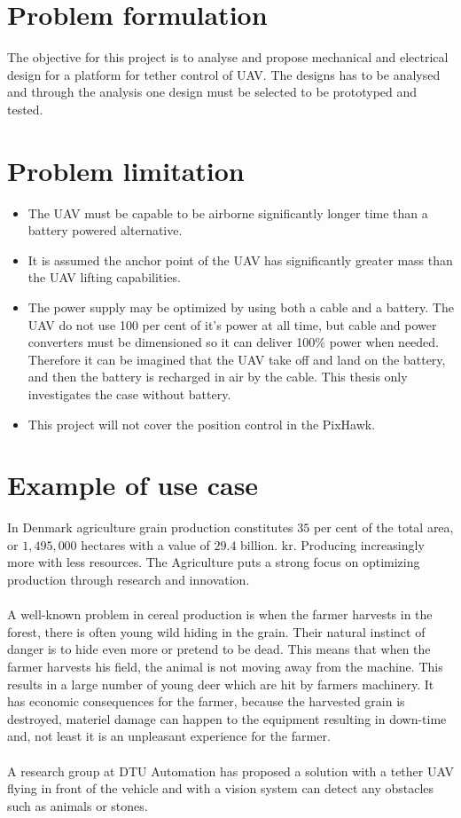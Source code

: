 \section{Problem formulation} 

The objective for this project is to analyse and propose mechanical and electrical design for a platform for tether control of UAV. The designs has to be analysed and through the analysis one design must be selected to be prototyped and tested.

\section{Problem limitation}
\begin{itemize}
\item The UAV must be capable to be airborne significantly longer time than a battery powered alternative.
\item It is assumed the anchor point of the UAV has significantly greater mass than the UAV lifting capabilities.
\item The power supply may be optimized by using both a cable and a battery. The UAV do not use 100 per cent of it's power at all time, but cable and power converters must be dimensioned so it can deliver 100\% power when needed. Therefore it can be imagined that the UAV take off and land on the battery, and then the battery is recharged in air by the cable. This thesis only investigates the case without battery.
\item This project will not cover the position control in the PixHawk. 
\end{itemize}


\section{Example of use case}

In Denmark agriculture grain production constitutes $35$ per cent of the total area, or $1,495,000$ hectares with a value of $29.4$ billion. kr. Producing increasingly more with less resources. The Agriculture puts a strong focus on optimizing production through research and innovation\cite{FødevarerLandbrug2013}.
\\
\\
A well-known problem in cereal production is when the farmer harvests in the forest, there is often young wild hiding in the grain. Their natural instinct of danger is to hide even more or pretend to be dead. This means that when the farmer harvests his field, the animal is not moving away from the machine. This results in a large number of young deer which are hit by farmers machinery. It has economic consequences for the farmer, because the harvested grain is destroyed, materiel damage can happen to the equipment resulting in down-time and, not least it is an unpleasant experience for the farmer.
\\
\\
A research group at DTU Automation has proposed a solution with a tether UAV flying in front of the vehicle and with a vision system can detect any obstacles such as animals or stones.

